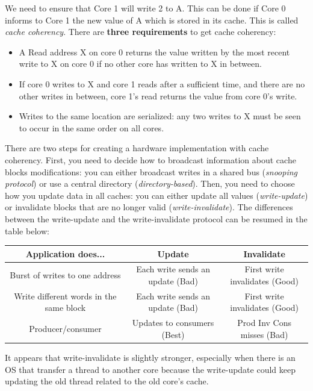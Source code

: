 \documentclass[10pt,letterpaper]{article}
\begin{document}
We need to ensure that Core 1 will write 2 to A. This can be done if Core 0 informs to Core 1 the new value of A which is stored in its cache. This is called \textit{cache coherency}. There are \textbf{three requirements} to get cache coherency:

\begin{itemize}
    \item A Read address X on core 0 returns the value written by the most recent write to X on core 0 if no other core has written to X in between.
    \item  If core 0 writes to X and core 1 reads after a sufficient time, and there are no other writes in between, core 1's read returns the value from core 0's write.
    \item Writes to the same location are serialized: any two writes to X must be seen to occur in the same order on all cores.
\end{itemize}

There are two steps for creating a hardware implementation with cache coherency. First, you need to decide how to broadcast information about cache blocks modifications: you can either broadcast writes in a shared bus (\textit{snooping protocol}) or use a central directory (\textit{directory-based}). Then, you need to choose how you update data in all caches: you can either update all values (\textit{write-update}) or invalidate blocks that are no longer valid (\textit{write-invalidate}). The differences between the write-update and the write-invalidate protocol can be resumed in the table below:

\begin{center}
 \begin{tabular}{||c c c||} 
 \hline
 Application does... & Update & Invalidate \\ [0.5ex] 
 \hline\hline
 Burst of writes to one address & Each write sends an update (Bad) & First write invalidates (Good)\\ 
 \hline
 Write different words in the same block & Each write sends an update (Bad) & First write invalidates (Good)\\
\hline
 Producer/consumer & Updates to consumers (Best) & Prod Inv Cons misses (Bad)\\
\hline
\end{tabular}
\end{center}

It appears that write-invalidate is slightly stronger, especially when there is an OS that transfer a thread to another core because the write-update could keep updating the old thread related to the old core's cache.
\end{document}
